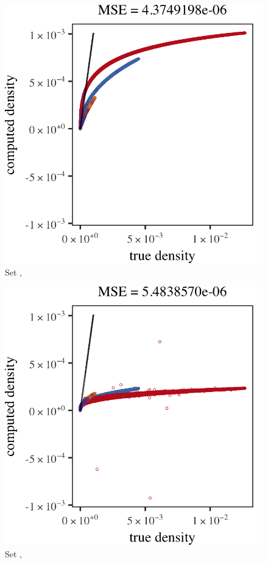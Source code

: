 \begin{subfigure}{0.23\textwidth}
	\centering
	\includegraphics[keepaspectratio=true, width=\textwidth, height=0.23\textheight]{4/img/all/results_ferdosi_3_120000_mbe_silverman.png}
	\caption{Set \ferdosiThree, \mbe}
	\label{fig:4:results:mbe:ferdosi3}
\end{subfigure}
\begin{subfigure}{0.23\textwidth}
	\centering
	\includegraphics[keepaspectratio=true, width=\textwidth, height=0.23\textheight]{4/img/all/results_ferdosi_3_120000_sambe_silverman}
	\caption{Set \ferdosiThree, \sambe}
	\label{fig:4:simulated:datasets:sambe:ferdosi3}
\end{subfigure}
